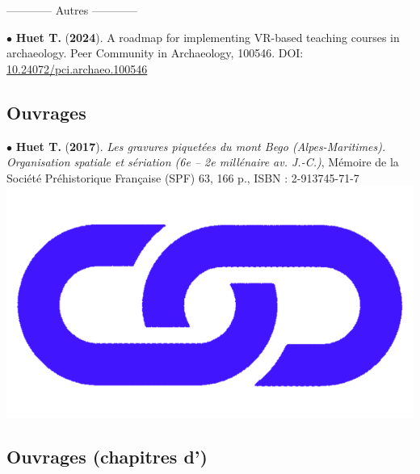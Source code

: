 \documentclass{article}
\newcommand{\fr}[1]{#1}       %
\newcommand{\en}[1]{}     %
\begin{document}
\smallbreak
\fr{\begin{center}------------ Autres ------------\end{center}}\en{{\begin{center}------------ Ohers ------------\end{center}}}
\smallbreak
$\bullet$ \textbf{Huet T.} (\textbf{2024}). A roadmap for implementing VR-based teaching courses in archaeology. Peer Community in Archaeology, 100546. DOI: \href{https://archaeo.peercommunityin.org/articles/rec?id=546}{10.24072/pci.archaeo.100546} 

\subsection*{\fr{Ouvrages}\en{Books}}

\smallbreak
$\bullet$ \textbf{Huet T.} (\textbf{2017}). \textit{Les gravures piquet\'{e}es du mont Bego (Alpes-Maritimes). Organisation spatiale et s\'{e}riation (6e -- 2e mill\'{e}naire av. J.-C.)}, M\'{e}moire de la Soci\'{e}t\'{e} Pr\'{e}historique Fran\c{c}aise (SPF) 63, 166 p., ISBN : 2-913745-71-7 \href{http://www.prehistoire.org/shop_515-40342-0-0/m63-2017-les-gravures-piquetees-du-mont-bego-alpes-maritimes-organisation-spatiale-et-seriation-vie-iie-millenaire-av.-j.-c.-t.-huet.html}{\includegraphics[scale=0.015]{link_darkblue.png}}

\bigbreak

\subsection*{\fr{Ouvrages (chapitres d')}\en{Book Chapters}}
\end{document}
